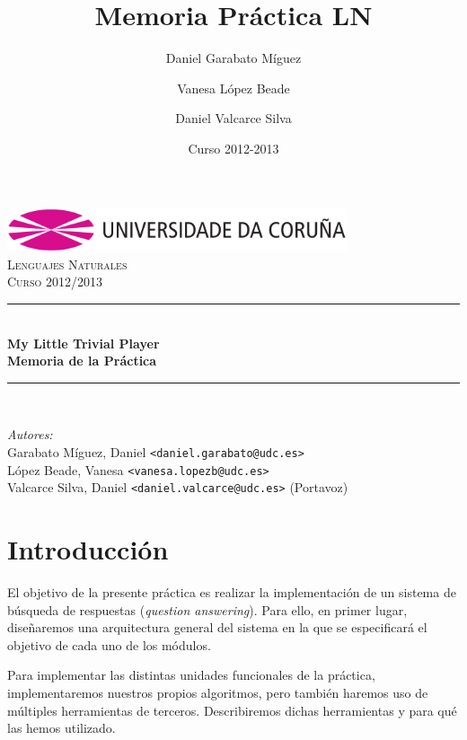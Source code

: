 \documentclass[12pt,a4paper,titlepage]{article}
\author{
	Daniel Garabato Míguez
	\and Vanesa López Beade
	\and Daniel Valcarce Silva
}
\title{Memoria Práctica LN}
\date{Curso 2012-2013}
\newcommand{\HRule}{\rule{\linewidth}{0.5mm}}
\begin{document}
\begin{titlepage}
\begin{center}
\includegraphics[width=10cm]{res/logo_udc}\\
\vspace{1cm}
\textsc{\Large Lenguajes Naturales}\\[0.5cm]
\textsc{\Large Curso 2012/2013}\\[0.5cm]

\HRule \\[0.4cm]
{ \huge \bfseries My Little Trivial Player}\\[0.4cm]
{ \Large \bfseries Memoria de la Práctica}\\[0cm]

\HRule \\[0cm]
\end{center}

\vfill
\emph{Autores:}
\vspace{0.5cm}
\\
\vspace{0.1cm}
Garabato Míguez, Daniel \texttt{<daniel.garabato@udc.es>}\\
\vspace{0.1cm}
López Beade, Vanesa \texttt{<vanesa.lopezb@udc.es>}\\
\vspace{0.1cm}
Valcarce Silva, Daniel \texttt{<daniel.valcarce@udc.es>} (Portavoz)\\

\end{titlepage}


\tableofcontents
\clearpage

\section{Introducción}
El objetivo de la presente práctica es realizar la implementación de un sistema de búsqueda de respuestas (\emph{question answering}). Para ello, en primer lugar, diseñaremos una arquitectura general del sistema en la que se especificará el objetivo de cada uno de los módulos.

Para implementar las distintas unidades funcionales de la práctica, implementaremos nuestros propios algoritmos, pero también haremos uso de múltiples herramientas de terceros. Describiremos dichas herramientas y para qué las hemos utilizado.
\end{document}
